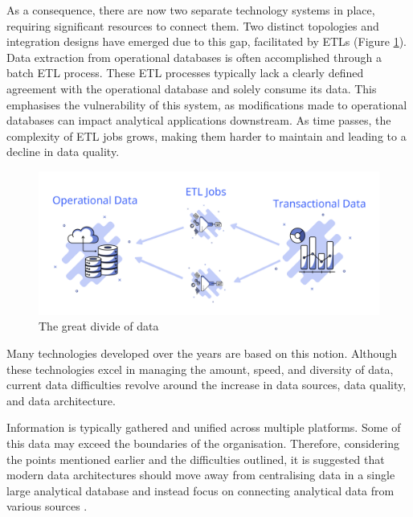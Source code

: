 \documentclass[preprint,12pt]{elsarticle}
\begin{document}
As a consequence, there are now two separate technology systems in place, requiring significant resources to connect them. Two distinct topologies and integration designs have emerged due to this gap, facilitated by ETLs (Figure \ref{fig:dataPlanes}). Data extraction from operational databases is often accomplished through a batch ETL process. These ETL processes typically lack a clearly defined agreement with the operational database and solely consume its data. This emphasises the vulnerability of this system, as modifications made to operational databases can impact analytical applications downstream. As time passes, the complexity of ETL jobs grows, making them harder to maintain and leading to a decline in data quality. 

\begin{figure}[ht]

  \centering

  \includegraphics[width=\linewidth]{images/data-planes.png}

  \caption{The great divide of data}

  \label{fig:dataPlanes}

\end{figure}

Many technologies developed over the years are based on this notion. Although these technologies excel in managing the amount, speed, and diversity of data, current data difficulties revolve around the increase in data sources, data quality, and data architecture. 

Information is typically gathered and unified across multiple platforms. Some of this data may exceed the boundaries of the organisation. Therefore, considering the points mentioned earlier and the difficulties outlined, it is suggested that modern data architectures should move away from centralising data in a single large analytical database and instead focus on connecting analytical data from various sources \cite{ataei2022state,DataMesh}. 
\end{document}
